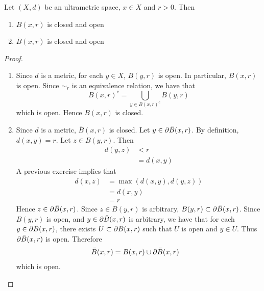 \documentclass{book}
\begin{document}
\begin{ex}
	Let $(X, d)$ be an ultrametric space, $x \in X$ and $r > 0$. Then 
	\begin{enumerate}
		\item $B(x, r)$ is closed and open
		\item $\bar{B}(x, r)$ is closed and open
	\end{enumerate}
\end{ex}

\begin{proof}\
	\begin{enumerate}
		\item Since $d$ is a metric, for each $y \in X$, $B(y,r)$ is open. In particular, $B(x,r)$ is open. Since $\sim_r$ is an equivalence relation, we have that 
		$$B(x,r)^c = \bigcup\limits_{y \in B(x,r)^c} B(y, r)$$
		which is open. Hence $B(x,r)$ is closed.
		\item Since $d$ is a metric, $\bar{B}(x,r)$ is closed. Let $y \in \partial \bar{B}(x,r)$. By definition, $d(x, y) = r$. Let $z \in B(y, r)$. Then  
		\begin{align*}
			d(y, z) 
			& < r \\
			& = d(x, y)
		\end{align*}
		A previous exercise implies that 
		\begin{align*}
			d(x, z)
			& = \max(d(x, y), d(y,z)) \\
			& = d(x,y) \\
			& = r
		\end{align*}
		Hence $z \in \partial \bar{B}(x, r)$. Since $z \in B(y, r)$ is arbitrary, $B(y, r) \subset \partial \bar{B}(x, r)$. Since $B(y, r)$ is open, and $y \in \partial \bar{B}(x, r)$ is arbitrary, we have that for each $y \in \partial \bar{B}(x, r)$, there exists $U \subset \partial \bar{B}(x, r)$ such that $U$ is open and $y \in U$. Thus $\partial \bar{B}(x, r)$ is open. Therefore 
		\begin{align*}
			\bar{B}(x, r)
			& = B(x,r) \cup \partial \bar{B}(x, r) 
		\end{align*} 
		which is open.
	\end{enumerate}
\end{proof}
\end{document}
